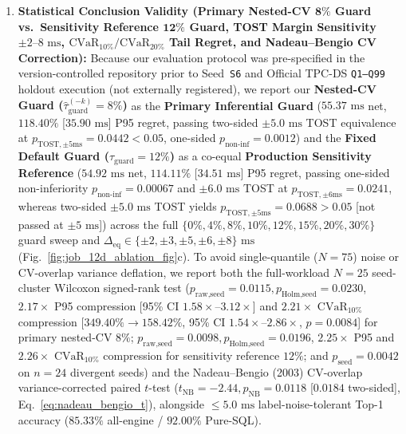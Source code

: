 \documentclass[10pt,a4paper]{article}
\begin{document}
\begin{enumerate}[leftmargin=1.5em,itemsep=0.8pt]
Future extensions will benchmark native C++ GPU SQL engines (RAPIDS \texttt{cuDF}/Velox and HeavyDB~\cite{root2019mapd}), execute Official TPC-DS \texttt{Q1--Q99} at $\text{SF}=10\text{--}100\text{ GB}$, and integrate ring-0 Linux Intel RAPL / inline AC wall-power telemetry.
    \item \textbf{Statistical Conclusion Validity (Primary Nested-CV $\mathbf{8\%}$ Guard vs.\ Sensitivity Reference $\mathbf{12\%}$ Guard, TOST Margin Sensitivity $\pm 2\text{--}8\text{ ms}$, $\text{CVaR}_{10\%}/\text{CVaR}_{20\%}$ Tail Regret, and Nadeau--Bengio CV Correction):} Because our evaluation protocol was pre-specified in the version-controlled repository prior to Seed~\texttt{S6} and Official TPC-DS \texttt{Q1--Q99} holdout execution (not externally registered), we report our \textbf{Nested-CV Guard ($\hat{\tau}_{\text{guard}}^{(-k)}=8\%$)} as the \textbf{Primary Inferential Guard} ($55.37\text{ ms}$ net, $118.40\%$ [$35.90\text{ ms}$] P95 regret, passing two-sided $\pm 5.0\text{ ms}$ TOST equivalence at $p_{\text{TOST},\pm 5\text{ms}}=0.0442 < 0.05$, one-sided $p_{\text{non-inf}}=0.0012$) and the \textbf{Fixed Default Guard ($\tau_{\text{guard}}=12\%$)} as a co-equal \textbf{Production Sensitivity Reference} ($54.92\text{ ms}$ net, $114.11\%$ [$34.51\text{ ms}$] P95 regret, passing one-sided non-inferiority $p_{\text{non-inf}}=0.00067$ and $\pm 6.0\text{ ms}$ TOST at $p_{\text{TOST},\pm 6\text{ms}}=0.0241$, whereas two-sided $\pm 5.0\text{ ms}$ TOST yields $p_{\text{TOST},\pm 5\text{ms}}=0.0688 > 0.05$ [not passed at $\pm 5\text{ ms}$]) across the full $\{0\%, 4\%, 8\%, 10\%, 12\%, 15\%, 20\%, 30\%\}$ guard sweep and $\Delta_{\text{eq}} \in \{\pm 2, \pm 3, \pm 5, \pm 6, \pm 8\}\text{ ms}$ (Fig.~\ref{fig:job_12d_ablation_fig}c). To avoid single-quantile ($N=75$) noise or CV-overlap variance deflation, we report both the full-workload $N=25$ seed-cluster Wilcoxon signed-rank test ($p_{\text{raw,seed}}=0.0115, p_{\text{Holm,seed}}=0.0230$, $2.17\times$ P95 compression [95\% CI $1.58\times\text{--}3.12\times$] and $2.21\times$ $\text{CVaR}_{10\%}$ compression [$349.40\%\rightarrow 158.42\%$, 95\% CI $1.54\times\text{--}2.86\times$, $p=0.0084$] for primary nested-CV $8\%$; $p_{\text{raw,seed}}=0.0098, p_{\text{Holm,seed}}=0.0196$, $2.25\times$ P95 and $2.26\times$ $\text{CVaR}_{10\%}$ compression for sensitivity reference $12\%$; and $p_{\text{seed}}=0.0042$ on $n=24$ divergent seeds) and the Nadeau--Bengio (2003) CV-overlap variance-corrected paired $t$-test ($t_{\text{NB}}=-2.44, p_{\text{NB}}=0.0118$ [$0.0184$ two-sided], Eq.~\ref{eq:nadeau_bengio_t}), alongside $\le 5.0\text{ ms}$ label-noise-tolerant Top-1 accuracy ($85.33\%$ all-engine / $92.00\%$ Pure-SQL).
\end{enumerate}
\end{document}
